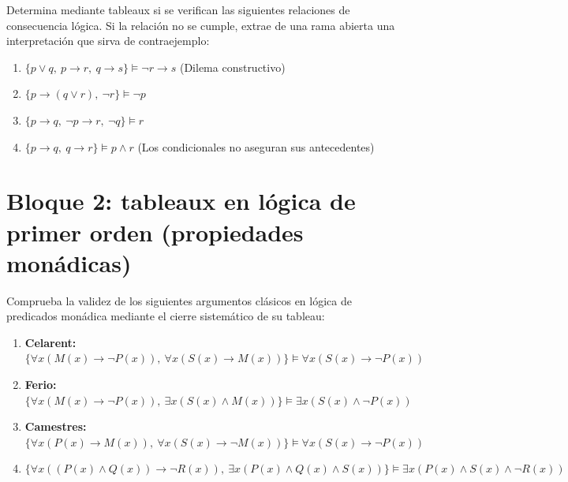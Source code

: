 \begin{pregunta}\label{e6-3}
Determina mediante tableaux si se verifican las siguientes relaciones de consecuencia lógica. Si la relación no se cumple, extrae de una rama abierta una interpretación que sirva de contraejemplo:
\begin{enumerate}
    \item $\{p \lor q, \ p \to r, \ q \to s\} \models \neg r \to s$ \quad (Dilema constructivo)
    \item $\{p \to (q \lor r), \ \neg r\} \models \neg p$
    \item $\{p \to q, \ \neg p \to r, \ \neg q\} \models r$
    \item $\{p \to q, \ q \to r\} \models p \land r$ \quad (Los condicionales no aseguran sus antecedentes)
\end{enumerate}
\end{pregunta}

\section*{Bloque 2: tableaux en lógica de primer orden (propiedades monádicas)}

\begin{pregunta}\label{e6-4}
Comprueba la validez de los siguientes argumentos clásicos en lógica de predicados monádica mediante el cierre sistemático de su tableau:
\begin{enumerate}
    \item \textbf{Celarent:} $\{\forall x (M(x) \to \neg P(x)), \ \forall x (S(x) \to M(x))\} \models \forall x (S(x) \to \neg P(x))$
    \item \textbf{Ferio:} $\{\forall x (M(x) \to \neg P(x)), \ \exists x (S(x) \land M(x))\} \models \exists x (S(x) \land \neg P(x))$
    \item \textbf{Camestres:} $\{\forall x (P(x) \to M(x)), \ \forall x (S(x) \to \neg M(x))\} \models \forall x (S(x) \to \neg P(x))$
    \item $\{\forall x ((P(x) \land Q(x)) \to \neg R(x)), \ \exists x (P(x) \land Q(x) \land S(x))\} \models \exists x (P(x) \land S(x) \land \neg R(x))$
\end{enumerate}
\end{pregunta}

